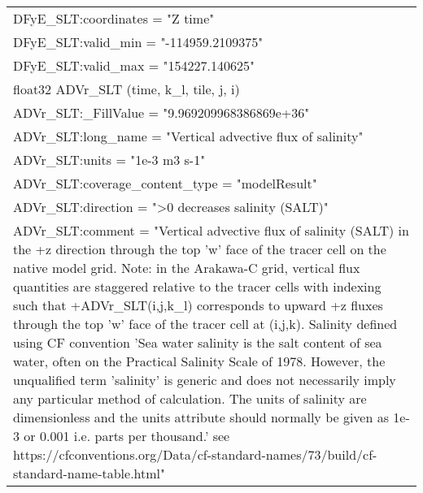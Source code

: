 \begin{longtable}{|p{\textwidth}|}
\hspace{0.5cm}\hspace{0.5cm}DFyE\_SLT:coordinates = "Z time"\\
\hspace{0.5cm}\hspace{0.5cm}DFyE\_SLT:valid\_min = "-114959.2109375"\\
\hspace{0.5cm}\hspace{0.5cm}DFyE\_SLT:valid\_max = "154227.140625"\\
\hspace{0.5cm}float32 ADVr\_SLT (time, k\_l, tile, j, i)\\
\hspace{0.5cm}\hspace{0.5cm}ADVr\_SLT:\_FillValue = "9.969209968386869e+36"\\
\hspace{0.5cm}\hspace{0.5cm}ADVr\_SLT:long\_name = "Vertical advective flux of salinity"\\
\hspace{0.5cm}\hspace{0.5cm}ADVr\_SLT:units = "1e-3 m3 s-1"\\
\hspace{0.5cm}\hspace{0.5cm}ADVr\_SLT:coverage\_content\_type = "modelResult"\\
\hspace{0.5cm}\hspace{0.5cm}ADVr\_SLT:direction = ">0 decreases salinity (SALT)"\\
\hspace{0.5cm}\hspace{0.5cm}ADVr\_SLT:comment = "Vertical advective flux of salinity (SALT) in the +z direction through the top 'w' face of the tracer cell on the native model grid. Note: in the Arakawa-C grid, vertical flux quantities are staggered relative to the tracer cells with indexing such that +ADVr\_SLT(i,j,k\_l) corresponds to upward +z fluxes through the top 'w' face of the tracer cell at (i,j,k). Salinity defined using CF convention 'Sea water salinity is the salt content of sea water, often on the Practical Salinity Scale of 1978. However, the unqualified term 'salinity' is generic and does not necessarily imply any particular method of calculation. The units of salinity are dimensionless and the units attribute should normally be given as 1e-3 or 0.001 i.e. parts per thousand.' see https://cfconventions.org/Data/cf-standard-names/73/build/cf-standard-name-table.html"\\

\end{longtable}
